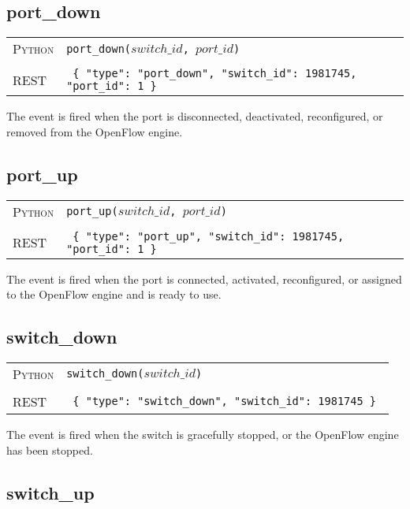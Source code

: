\subsection{port\_down}

\bigskip
\begin{tabularx}{\linewidth}{lX}
\textsc{Python}   & \texttt{port\_down($switch\_id$, $port\_id$)} \\ \\
\textsc{REST} & \texttt{ \{ "type": "port\_down", "switch\_id": 1981745, "port\_id": 1 \} } 
\end{tabularx}

The  event is fired when the port is disconnected, deactivated, reconfigured, or
removed from the OpenFlow engine.  
 
\subsection{port\_up}

\bigskip
\begin{tabularx}{\linewidth}{lX}
\textsc{Python}   & \texttt{port\_up($switch\_id$, $port\_id$)} \\ \\
\textsc{REST} & \texttt{ \{ "type": "port\_up", "switch\_id": 1981745, "port\_id": 1 \} } 
\end{tabularx}

The  event is fired when the port is connected, activated, reconfigured, or
assigned to the OpenFlow engine and is ready to use.  

\subsection{switch\_down}

\bigskip
\begin{tabularx}{\linewidth}{lX}
\textsc{Python}   & \texttt{switch\_down($switch\_id$)} \\ \\
\textsc{REST} & \texttt{ \{ "type": "switch\_down", "switch\_id": 1981745 \} } 
\end{tabularx}

The  event is fired when the switch is gracefully stopped, or the OpenFlow
engine has been stopped.  
 
\subsection{switch\_up}

